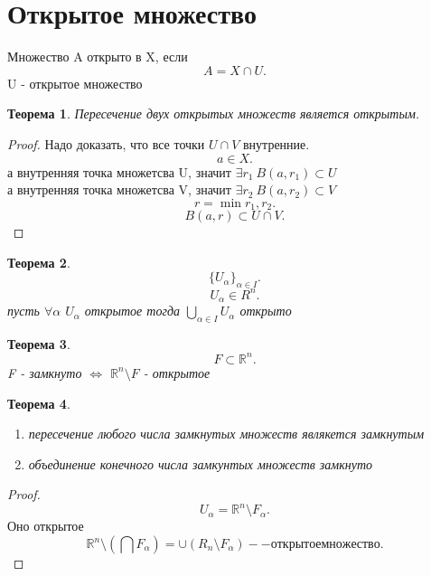 \documentclass[14pt]{extarticle}
\newtheorem{theorem}{Теорема}
\begin{document}
\section{Открытое множество}
Множество A открыто в  X, если
\[
A = X \cap U
.\] 
U - открытое множество
\begin{theorem}
    Пересечение двух открытых множеств является открытым.
\end{theorem}
\begin{proof}
    Надо доказать, что все точки $U \cap V$ внутренние.\\
    \[
    a \in X
    .\] 
    а внутренняя точка множетсва U, значит  $\exists r_1  ~ B(a,r_1) \subset U$\\
    а внутренняя точка множетсва V, значит  $\exists r_2  ~ B(a,r_2) \subset V$
    \[
        r = \min{r_1,r_2}
    .\] 
    \[
    B(a,r) \subset U \cap V
    .\] 
\end{proof}
\begin{theorem}
    \[
        \{U_{\alpha}\}_{\alpha \in I}
    .\] 
    \[
    U_{\alpha} \in R^{n}
    .\] 
    пусть $\forall  \alpha$ $U_{\alpha}$ открытое
    тогда $\bigcup_{\alpha \in I} U_{\alpha}$ открыто
\end{theorem}
\begin{theorem}
    \[
    F \subset \mathbb{R}^{n}
    .\] 
    F - замкнуто $\iff$  $\mathbb{R}^{n} \setminus F$ - открытое
\end{theorem}
\begin{theorem}
    \begin{enumerate}
        \item пересечение любого числа замкнутых множеств являкется замкнутым
        \item объединение конечного числа замкунтых множеств замкнуто
    \end{enumerate}
\end{theorem}
\begin{proof}
     \[
     U_{\alpha} = \mathbb{R}^{n} \setminus F_{\alpha}
     .\] 
     Оно открытое
     \[
     \mathbb{R}^{n} \setminus (\bigcap F_{\alpha}) = 
     \cup (R_{n} \setminus F_{\alpha}) -- открытое множество
     .\] 
\end{proof}
\end{document}

